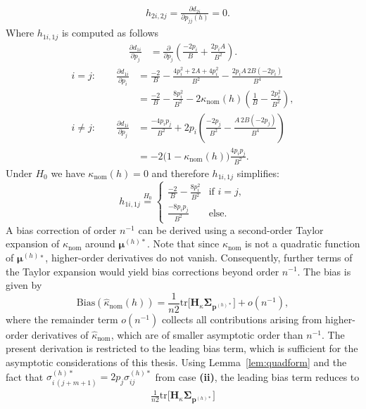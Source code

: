 ﻿\documentclass[12pt,a4paper]{scrreprt}
\theoremstyle{definition}
\begin{document}
\begin{appendices}
\begin{align*}
    \quad h_{2i, 2j} = \frac{\partial d_{2i}}{\partial p_{jj}(h)} = 0.
\end{align*}
Where $h_{1i, 1j}$ is computed as follows 
\begin{align*}
\frac{\partial d_{1i}}{\partial p_j}
&=
\frac{\partial}{\partial p_j}
\left(
\frac{-2p_i}{B}
+
\frac{2p_iA}{B^2}
\right).
\end{align*}
\[
\begin{aligned}
i=j:\qquad
\frac{\partial d_{1i}}{\partial p_i}
&=
\frac{-2}{B}
-\frac{4p_i^2+2A+4p_i^2}{B^2}
-\frac{2p_iA\,2B(-2p_i)}{B^4} \\
&=
\frac{-2}{B}
-\frac{8p_i^2}{B^2}
-2\kappa_{\mathrm{nom}}(h)
\left(
\frac{1}{B}
-\frac{2p_i^2}{B^2}
\right),
\\[1em]
i\neq j:\qquad
\frac{\partial d_{1i}}{\partial p_j}
&=
\frac{-4p_ip_j}{B^2}
+
2p_i
\left(
\frac{-2p_j}{B^2}
-\frac{A\,2B(-2p_j)}{B^4}
\right) \\
&=
-2\bigl(1-\kappa_{\mathrm{nom}}(h)\bigr)
\frac{4p_ip_j}{B^2}.
\end{aligned}
\]
Under $H_0$ we have $\kappa_{\mathrm{nom}}(h) = 0$ and therefore $h_{1i, 1j}$ simplifies:
\[h_{1i, 1j}\overset{H_0}{=}\begin{cases} \frac{-2 }{B} - \frac{8p_i^2}{B^2}& \text{if } i = j,\\
          \frac{-8 p_i p_j }{B^2} & \text{else.}
    \end{cases}\]
A bias correction of order $n^{-1}$ can be derived using a second-order Taylor expansion of $\kappa_{\mathrm{nom}}$ around $\boldsymbol{\mu}^{(h)*}$. 
Note that since $\kappa_{\mathrm{nom}}$ is not a quadratic function of $\boldsymbol{\mu}^{(h)∗}$, higher-order 
derivatives do not vanish. Consequently, further terms of the Taylor expansion would yield 
bias corrections beyond order $n^{-1}$. The bias is given by 
\[\mathrm{Bias}(\hat{\kappa}_{\mathrm{nom}}(h))=\frac{1}{n2}\mathrm{tr}\bigl[\boldsymbol{H}_\kappa\boldsymbol{\Sigma}_{\boldsymbol{p}^{(h)*}}\bigr] + o(n^{-1}),\]
where the remainder term $o(n^{-1})$ collects all contributions arising from higher-order derivatives of $\hat{\kappa}_{\mathrm{nom}}$, 
which are of smaller asymptotic order than $n^{-1}$. The present derivation is restricted to the leading bias term, which is sufficient for the asymptotic considerations of this thesis.
Using Lemma~\ref{lem:quadform} and the fact that $\sigma^{(h)*}_{i\,(j+m+1)} = 2 p_j \sigma^{(h)*}_{ij}$ from case \textbf{(ii)}, the leading bias term reduces to
\begin{align*}
    \frac{1}{n2}\mathrm{tr}\bigl[\boldsymbol{H}_\kappa\boldsymbol{\Sigma}_{\boldsymbol{p}^{(h)*}}\bigr] 

\end{align*}
\end{appendices}
\end{document}
